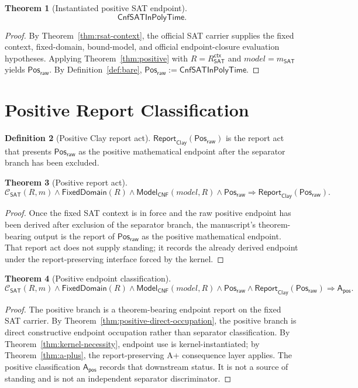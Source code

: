 \documentclass[11pt]{article}
\newtheorem{theorem}{Theorem}[section]
\theoremstyle{definition}
\newtheorem{definition}[theorem]{Definition}
\theoremstyle{remark}
\newcommand{\PosRaw}{\mathsf{Pos}_{\mathsf{raw}}}
\newcommand{\Apos}{\mathsf{A}_{\mathsf{pos}}}
\newcommand{\CnfSATP}{\mathsf{CnfSATInPolyTime}}
\newcommand{\ClayCtx}{\mathcal{C}_{\mathsf{SAT}}(R,m)}
\newcommand{\ReportClay}[1]{\mathsf{Report}_{\mathsf{Clay}}(#1)}
\newcommand{\RSATctx}{R_{\mathsf{SAT}}^{\mathsf{ctx}}}
\newcommand{\FixedDom}{\mathsf{FixedDomain}}
\newcommand{\ModelOfCnf}{\mathsf{Model}_{\mathsf{CNF}}}
\begin{document}
\begin{theorem}[Instantiated positive SAT endpoint]
\label{thm:positive-instantiated}
\[
  \CnfSATP.
\]
\end{theorem}

\begin{proof}
By Theorem~\ref{thm:rsat-context}, the official SAT carrier supplies the fixed context, fixed-domain, bound-model, and official endpoint-closure evaluation hypotheses. Applying Theorem~\ref{thm:positive} with \(R=\RSATctx\) and \(model=m_{\mathsf{SAT}}\) yields \(\PosRaw\). By Definition~\ref{def:bare}, \(\PosRaw:=\CnfSATP\).
\end{proof}

\section{Positive Report Classification}\label{sec:positive-classification}

\begin{definition}[Positive Clay report act]\label{def:positive-report}
\(\ReportClay{\PosRaw}\) is the report act that presents \(\PosRaw\) as the positive mathematical endpoint after the separator branch has been excluded.
\end{definition}

\begin{theorem}[Positive report act]\label{thm:positive-report}
\[
  \ClayCtx\wedge\FixedDom(R)\wedge\ModelOfCnf(model,R)\wedge\PosRaw\Rightarrow\ReportClay{\PosRaw}.
\]
\end{theorem}

\begin{proof}
Once the fixed SAT context is in force and the raw positive endpoint has been derived after exclusion of the separator branch, the manuscript's theorem-bearing output is the report of \(\PosRaw\) as the positive mathematical endpoint. That report act does not supply standing; it records the already derived endpoint under the report-preserving interface forced by the kernel.
\end{proof}

\begin{theorem}[Positive endpoint classification]\label{thm:pos-class}
\[
  \ClayCtx\wedge\FixedDom(R)\wedge\ModelOfCnf(model,R)\wedge\PosRaw\wedge\ReportClay{\PosRaw}
  \Rightarrow \Apos.
\]
\end{theorem}

\begin{proof}
The positive branch is a theorem-bearing endpoint report on the fixed SAT carrier. By Theorem~\ref{thm:positive-direct-occupation}, the positive branch is direct constructive endpoint occupation rather than separator classification. By Theorem~\ref{thm:kernel-necessity}, endpoint use is kernel-instantiated; by Theorem~\ref{thm:a-plus}, the report-preserving A+ consequence layer applies. The positive classification \(\Apos\) records that downstream status. It is not a source of standing and is not an independent separator discriminator.
\end{proof}
\end{document}
